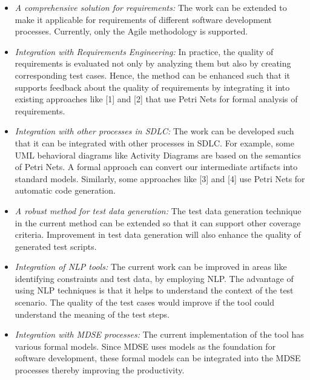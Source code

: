 \begin{itemize}
\item \textit{A comprehensive solution for requirements:} The work can be extended to make it applicable for requirements of different software development processes. Currently, only the Agile methodology is supported.
\item \textit{Integration with Requirements Engineering:}  In practice, the quality of requirements is evaluated not only by analyzing them but also by creating corresponding test cases. Hence, the method can be enhanced such that it supports feedback about the quality of requirements by integrating it into existing approaches like [1] and [2] that use Petri Nets for formal analysis of requirements. 
\item \textit{Integration with other processes in SDLC:} The work can be developed such that it can be integrated with other processes in SDLC. For example, some UML behavioral diagrams like Activity Diagrams are based on the semantics of Petri Nets. A formal approach can convert our intermediate artifacts into standard models. Similarly, some approaches like [3] and [4] use Petri Nets for automatic code generation. 
\item \textit{A robust method for test data generation:} The test data generation technique in the current method can be extended so that it can support other coverage criteria.  Improvement in test data generation will also enhance the quality of generated test scripts.
\item \textit{Integration of NLP tools:} The current work can be improved in areas like identifying constraints and test data, by employing NLP. The advantage of using NLP techniques is that it helps to understand the context of the test scenario. The quality of the test cases would improve if the tool could understand the meaning of the test steps.
\item \textit{Integration with MDSE processes:} The current implementation of the tool has various formal models. Since MDSE uses models as the foundation for software development, these formal models can be integrated into the MDSE processes thereby improving the productivity.
\end{itemize} 


